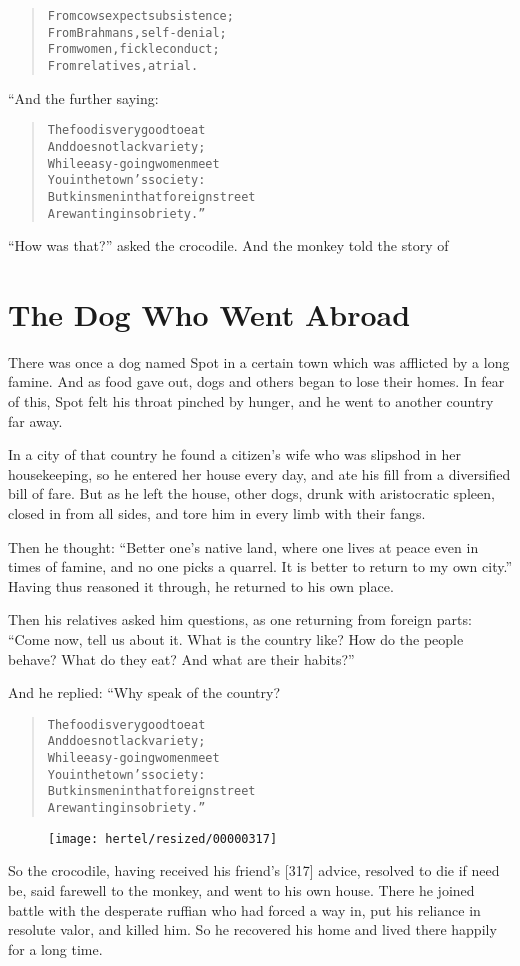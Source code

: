 \documentclass[article, twoside, 10pt]{memoir}
\renewenvironment{verbatim}{%
\begin{quote}%
\vskip -10pt%
\begin{alltt}\normalfont\small}{\end{alltt}%
\end{quote}%
\vskip -10pt
} %
\begin{document}
\begin{verbatim}
From cows expect subsistence;
    From Brahmans, self-denial;
From women, fickle conduct;
    From relatives, a trial.
\end{verbatim}
“And the further saying:

\begin{verbatim}
The food is very good to eat
    And does not lack variety;
While easy-going women meet
    You in the town's society:
But kinsmen in that foreign street
    Are wanting in sobriety.”
\end{verbatim}
``How was that?'' asked the crocodile. And the monkey told the
story of

\chapter{The Dog Who Went Abroad}

There was once a dog named Spot in a certain town which was
afflicted by a long famine. And as food gave out, dogs and others
began to lose their homes. In fear of this, Spot felt his throat
pinched by hunger, and he went to another country far away.

In a city of that country he found a citizen's wife who was
slipshod in her housekeeping, so he entered her house every day,
and ate his fill from a diversified bill of fare. But as he left
the house, other dogs, drunk with aristocratic spleen, closed in
from all sides, and tore him in every limb with their fangs.

Then he thought:
``Better one's native land, where one lives at peace even in times of famine, and no one picks a quarrel. It is better to return to my own city.''
Having thus reasoned it through, he returned to his own place.

Then his relatives asked him questions, as one returning from
foreign parts:
``Come now, tell us about it. What is the country like? How do the people behave? What do they eat? And what are their habits?''

And he replied: “Why speak of the country?

\begin{verbatim}
The food is very good to eat
    And does not lack variety;
While easy-going women meet
    You in the town's society:
But kinsmen in that foreign street
    Are wanting in sobriety.”
\end{verbatim}
\begin{figure}[p]\texttt{[image: hertel/resized/00000317]}\end{figure}So the crocodile, having received his friend's [317] advice,
resolved to die if need be, said farewell to the monkey, and went
to his own house. There he joined battle with the desperate ruffian
who had forced a way in, put his reliance in resolute valor, and
killed him. So he recovered his home and lived there happily for a
long time.
\end{document}

